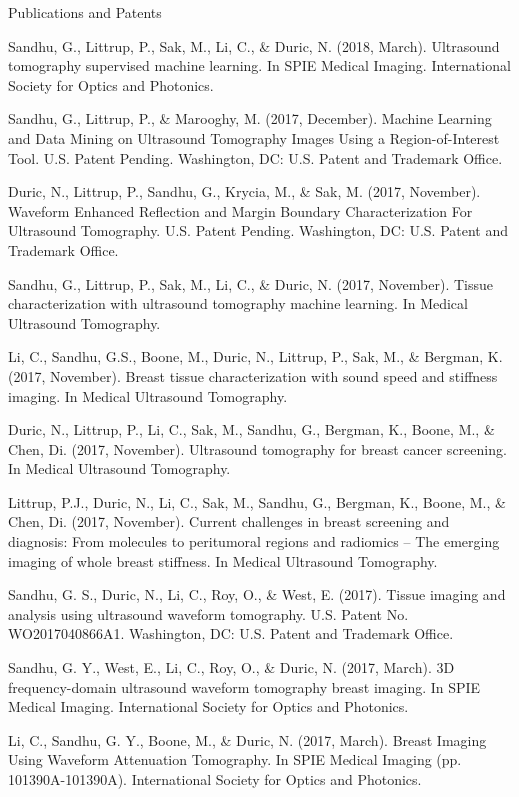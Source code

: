 \documentclass{resume} %
\begin{document}
\begin{rSection}{Publications and Patents}
\item Sandhu, G., Littrup, P., Sak, M., Li, C., \& Duric, N. (2018, March). Ultrasound tomography supervised machine learning. In SPIE Medical Imaging. International Society for Optics and Photonics.
\item Sandhu, G., Littrup, P., \& Marooghy, M. (2017, December). Machine Learning and Data Mining on Ultrasound Tomography Images Using a Region-of-Interest Tool. U.S. Patent Pending. Washington, DC: U.S. Patent and Trademark Office.
\item Duric, N., Littrup, P., Sandhu, G., Krycia, M., \& Sak, M. (2017, November). Waveform Enhanced Reflection and Margin Boundary Characterization For Ultrasound Tomography. U.S. Patent Pending. Washington, DC: U.S. Patent and Trademark Office.
\item Sandhu, G., Littrup, P., Sak, M., Li, C., \& Duric, N. (2017, November). Tissue characterization with ultrasound tomography machine learning. In Medical Ultrasound Tomography.
\item Li, C., Sandhu, G.S., Boone, M., Duric, N., Littrup, P., Sak, M., \& Bergman, K. (2017, November). Breast tissue characterization with sound speed and stiffness imaging. In Medical Ultrasound Tomography.
\item Duric, N., Littrup, P., Li, C., Sak, M., Sandhu, G., Bergman, K., Boone, M., \& Chen, Di. (2017, November). Ultrasound tomography for breast cancer screening. In Medical Ultrasound Tomography.
\item Littrup, P.J., Duric, N., Li, C., Sak, M., Sandhu, G., Bergman, K., Boone, M., \& Chen, Di. (2017, November). Current challenges in breast screening and diagnosis: From molecules to peritumoral regions and radiomics – The emerging imaging of whole breast stiffness. In Medical Ultrasound Tomography.
\item Sandhu, G. S., Duric, N., Li, C., Roy, O., \& West, E. (2017). Tissue imaging and analysis using ultrasound waveform tomography. U.S. Patent No. WO2017040866A1. Washington, DC: U.S. Patent and Trademark Office.
\item Sandhu, G. Y., West, E., Li, C., Roy, O., \& Duric, N. (2017, March). 3D frequency-domain ultrasound waveform tomography breast imaging. In SPIE Medical Imaging. International Society for Optics and Photonics.
\item Li, C., Sandhu, G. Y., Boone, M., \& Duric, N. (2017, March). Breast Imaging Using Waveform Attenuation Tomography. In SPIE Medical Imaging (pp. 101390A-101390A). International Society for Optics and Photonics.

\end{rSection}
\end{document}
